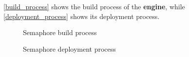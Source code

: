 \documentclass[a4paper,11pt,titlepage,abstract,numbers=noenddot,automark,mnsy,intlimits,rgb,dvipsnames]{report}
\begin{document}
\autoref{build_process} shows the build process of the \textbf{engine}, while \autoref{deployment_process} shows
its deployment process.
\begin{figure}[H]
\begin{center}
\noindent{}
\end{center}
\caption{Semaphore build process}
\label{build_process}
\end{figure}
\begin{figure}[H]
\begin{center}
\noindent{}
\end{center}
\caption{Semaphore deployment process}
\label{deployment_process}
\end{figure}
\end{document}
